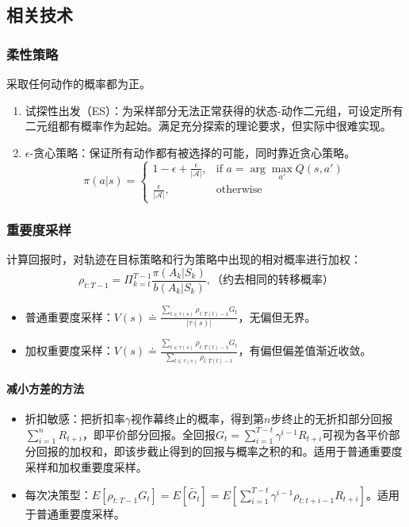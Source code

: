 \documentclass[
12pt, %
a4paper, 
oneside, %
headinclude,footinclude, %
]{scrartcl}
\begin{document}
\subsection{相关技术}
\subsubsection{柔性策略}
采取任何动作的概率都为正。
\begin{enumerate}
\item 试探性出发（ES）：为采样部分无法正常获得的状态-动作二元组，可设定所有二元组都有概率作为起始。满足充分探索的理论要求，但实际中很难实现。
\item $ \epsilon $-贪心策略：保证所有动作都有被选择的可能，同时靠近贪心策略。
$$
\pi(a|s) = 
\begin{cases} 
1 - \epsilon + \frac{\epsilon}{|\mathcal{A}|}, & \text{if } a = \arg\max_{a'} Q(s, a') \\
\frac{\epsilon}{|\mathcal{A}|}, & \text{otherwise}
\end{cases}
$$
\end{enumerate}
\subsubsection{重要度采样}
计算回报时，对轨迹在目标策略和行为策略中出现的相对概率进行加权：
$$
\rho_{t:T - 1} = \Pi_{k = t}^{T - 1} \frac{\pi(A_k|S_k)}{b(A_k|S_k)}, \text{（约去相同的转移概率）}
$$
\begin{itemize}
\item 普通重要度采样：$ V(s) \doteq \frac{\sum_{t \in \tau(s)} \rho_{t:T(t) - 1}G_t}{|\tau(s)|} $，无偏但无界。
\item 加权重要度采样：$ V(s) \doteq \frac{\sum_{t \in \tau(s)} \rho_{t:T(t) - 1}G_t}{\sum_{t \in \tau(s)} \rho_{t:T(t) - 1}} $，有偏但偏差值渐近收敛。
\end{itemize}
\paragraph{减小方差的方法}
\begin{itemize}
\item 折扣敏感：把折扣率$ \gamma $视作幕终止的概率，得到第$ n $步终止的无折扣部分回报$ \sum_{i = 1}^n R_{t + i} $，即平价部分回报。全回报$ G_t = \sum_{i = 1}^{T - t} \gamma^{i - 1}R_{t + i} $可视为各平价部分回报的加权和，即该步截止得到的回报与概率之积的和。适用于普通重要度采样和加权重要度采样。
\item 每次决策型：$ E[\rho_{t:T - 1}G_t] = E[\tilde{G_t}] = E[\sum_{i = 1}^{T - t} \gamma^{i - 1} \rho_{t:t + i - 1}R_{t + i}] $。适用于普通重要度采样。
\end{itemize}
\end{document}
